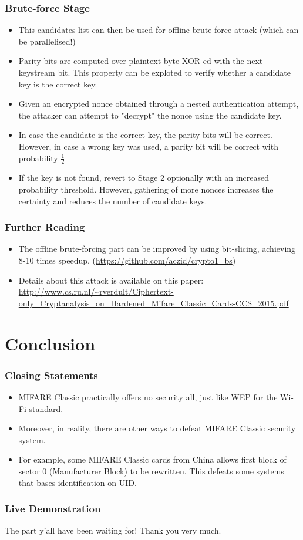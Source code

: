 \documentclass[12pt]{beamer}
\begin{document}
\begin{frame}
\frametitle{Brute-force Stage}
\begin{itemize}
	\item This candidates list can then be used for offline brute force attack (which can be parallelised!)
	\item Parity bits are computed over plaintext byte XOR-ed with the next keystream bit. This property can be exploted to verify whether a candidate key is the correct key.
	\item Given an encrypted nonce obtained through
	a nested authentication attempt, the attacker can attempt to "decrypt" the nonce using the candidate key.
	\item In case the candidate is the correct key, the parity bits will be correct. However, in case a wrong key was used, a parity bit will be
	correct with probability $\frac{1}{2}$
	\item If the key is not found, revert to Stage 2 optionally with an increased probability threshold. However, gathering of more nonces increases the certainty and reduces the number of candidate keys.
\end{itemize}
\end{frame}

\begin{frame}
\frametitle{Further Reading}
\begin{itemize}
	\item The offline brute-forcing part can be improved by using bit-slicing, achieving 8-10 times speedup. (\url{https://github.com/aczid/crypto1_bs})
	\item Details about this attack is available on this paper: \url{http://www.cs.ru.nl/~rverdult/Ciphertext-only_Cryptanalysis_on_Hardened_Mifare_Classic_Cards-CCS_2015.pdf}
\end{itemize}
\end{frame}

\section{Conclusion}
\begin{frame}
\frametitle{Closing Statements}
\begin{itemize}
	\item MIFARE Classic practically offers no security all, just like WEP for the Wi-Fi standard.
	\item Moreover, in reality, there are other ways to defeat MIFARE Classic security system.
	\item For example, some MIFARE Classic cards from China allows first block of sector 0 (Manufacturer Block) to be rewritten. This defeats some systems that bases identification on UID.
\end{itemize}
\end{frame}

\begin{frame}
\frametitle{Live Demonstration}
The part y'all have been waiting for!
Thank you very much.
\end{frame}
\end{document}
